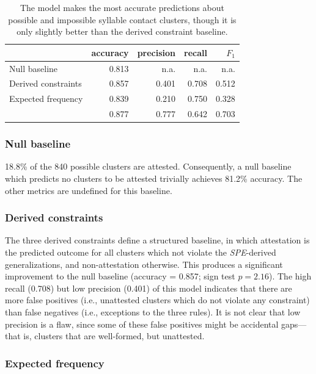 \begin{table} \centering
\begin{tabular}{l | r r r r}
\toprule
                     & accuracy & precision & recall & $F_1$ \\
\midrule
Null baseline        & 0.813    & n.a.      & n.a.   & n.a.  \\
Derived constraints  & 0.857    & 0.401     & 0.708  & 0.512 \\
Expected frequency   & 0.839    & 0.210     & 0.750  & 0.328 \\
\citet{Hayes2008a}   & 0.877    & 0.777     & 0.642  & 0.703 \\
\bottomrule
\end{tabular}
\caption{The \citeauthor{Hayes2008a} model makes the most accurate predictions about possible and impossible syllable contact clusters, though it is only slightly better than the derived constraint baseline.}
\label{cmresults}
\end{table}

\subsubsection{Null baseline}

18.8\% of the 840 possible clusters are attested. Consequently, a null baseline which predicts no clusters to be attested trivially achieves 81.2\% accuracy. The other metrics are undefined for this baseline.

\subsubsection{Derived constraints}

The three derived constraints define a structured baseline, in which attestation is the predicted outcome for all clusters which not violate the \emph{SPE}-derived generalizations, and non-attestation otherwise. This produces a significant improvement to the null baseline (accuracy = 0.857; sign test $p = 2.16$). The high recall (0.708) but low precision (0.401) of this model indicates that there are more false positives (i.e., unattested clusters which do not violate any constraint) than false negatives (i.e., exceptions to the three rules). It is not clear that low precision is a flaw, since some of these false positives might be accidental gaps---that is, clusters that are well-formed, but unattested.

\subsubsection{Expected frequency}

